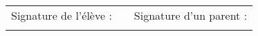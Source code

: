 \documentclass[a4paper, 14pt]{extarticle}
\begin{document}
%	
%	
%	
%	
%	
%	
%	
%
%
%	
%	
%	
%	
%	
%	
%	
%	

\vspace*{0.5cm}
\begin{tabular}{ccr}
	
	Signature de l'élève : & \hspace*{5cm} & Signature d'un parent : \\
	&  &                      
\end{tabular}
	
	
	
%
\end{document}
